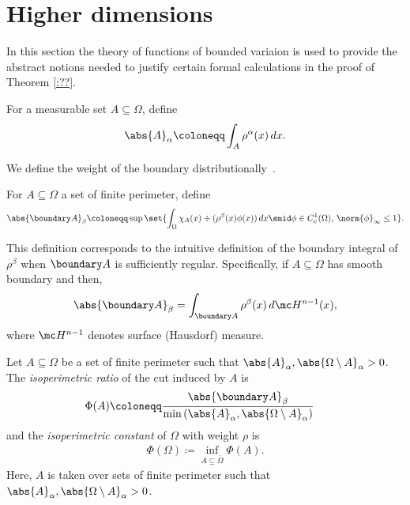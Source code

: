 
\section{Higher dimensions}
\label{sec:Ahigher_dim}
In this section the theory of functions of bounded variaion is used to
provide the abstract notions needed to justify certain formal
calculations in the proof of Theorem \ref{:??}.

\begin{definition}
For a measurable set $A\subseteq \Omega$, define
\begin{align*}
\abs{A}_\alpha \coloneqq \int_A \rho^\alpha(x)\,dx.
\end{align*}
\end{definition}
We define the weight of the boundary distributionally~\cite{betta2008weighted,parini2011introduction}.
\begin{definition}
\label{def:betaBdy}
For $A\subseteq\Omega$ a set of finite perimeter, define
\begin{align*}
\abs{\boundary A}_\beta \coloneqq \sup\set{\int_\Omega \chi_A(x) \div(\rho^\beta (x) \phi(x))\,dx\smid \phi\in C_c^1(\Omega),\, \norm{\phi}_{\infty}\leq 1}.
\end{align*}
\end{definition}

\begin{remark}
  This definition corresponds to the intuitive definition of the
  boundary integral of $\rho^\beta$ when $\boundary A$ is sufficiently
  regular.  Specifically, if $A\subseteq\Omega$ has smooth boundary
  and then,
  $$
  \abs{\boundary A}_\beta = \int_{\boundary A} \rho^\beta(x)\,d \mc H^{n-1}(x),
  $$
  where $\mc H^{n-1}$ denotes surface (Hausdorf) measure.
\end{remark}


\begin{definition}
Let $A\subseteq\Omega$ be a set of finite perimeter such that $\abs{A}_\alpha,\abs{\Omega\setminus A}_\alpha >0$. The \textit{isoperimetric ratio} of the cut induced by $A$ is
\begin{align*}
\Phi(A) &\coloneqq \frac{\abs{\boundary A}_\beta}{\min\left(\abs{A}_\alpha,\abs{\Omega\setminus A}_\alpha\right)}
\end{align*}
and the \textit{isoperimetric constant} of $\Omega$ with weight $\rho$ is
\begin{align*}
\Phi(\Omega)\coloneqq \inf_{A\subseteq\overline{\Omega}} \Phi(A).
\end{align*}
Here, $A$ is taken over sets of finite perimeter such that $\abs{A}_\alpha,\abs{\Omega\setminus A}_\alpha>0$.
\end{definition}

